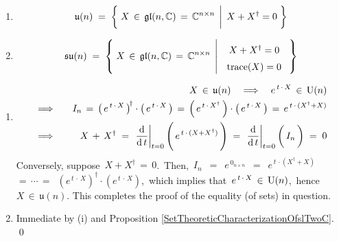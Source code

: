 \vskip 0.5cm
\begin{proposition}
\mbox{}
\vskip 0.1cm
\begin{enumerate}
\item
	\begin{equation*}
	\mathfrak{u}(n)
	\; = \;
		\left\{\;
			X \,\in\, \mathfrak{gl}(n,\C) \,=\, \C^{n \times n}
			\;\left\vert\;\,
				X + X^{\dagger} = \overset{{\color{white}1}}{0}
				\right.
			\,\right\}
	\end{equation*}
\item
	\begin{equation*}
	\mathfrak{su}(n)
	\; = \;
		\left\{\;
			X \,\in\, \mathfrak{gl}(n,\C) \,=\, \C^{n \times n}
			\;\left\vert\;\,
				\begin{array}{c}
				X + X^{\dagger} = \overset{{\color{white}1}}{0}
				\\
				\textnormal{trace}(X) = \overset{{\color{white}1}}{0}
				\end{array}
				\right.
			\,\right\}
	\end{equation*}
\end{enumerate}
\end{proposition}
\proof
\begin{enumerate}
\item
	\begin{eqnarray*}
	&&
		X \,\in\, \mathfrak{u}(n)
		\quad\Longrightarrow\quad
		e^{\,t\,\cdot\,X} \,\in\, \textnormal{U}(n)
	\\
	& \Longrightarrow\quad &
		I_{n}
			\,=\, \left(\,e^{\,t\,\cdot\,X}\,\right)^{\!\dagger} \cdot \left(\,e^{\,t\,\cdot\,X}\,\right)
			\,=\, \left(\,e^{\,t\,\cdot\,X^{\dagger}}\,\right) \cdot \left(\,e^{\,t\,\cdot\,X}\,\right)
			\,=\, e^{\,t\,\cdot\,(X^{\dagger}+X)}
	\\
	& \Longrightarrow\quad &
		X \,+\, X^{\dagger}
		\; = \;
			\left.\dfrac{\d}{\d\,t}\right\vert_{t=0}\left(\,\overset{{\color{white}1}}{e^{\,t\,\cdot\,(X+X^{\dagger})}}\,\right)
		\; = \;
			\left.\dfrac{\d}{\d\,t}\right\vert_{t=0}\left(\,\overset{{\color{white}1}}{I_{n}}\,\right)
		\; = \;
			0
	\end{eqnarray*}
	Conversely, suppose \,$X + X^{\dagger} \,=\, 0$.\,
	Then, \,$I_{n}$
	\,$=$\, $e^{\,0_{n \times n}}$
	\,$=$\, $e^{\,t\,\cdot(X^{\dagger}+X)}$
	\,$=\, \cdots \,=$\, $\left(e^{\,t\,\cdot\,X}\right)^{\!\dagger}\cdot\left(e^{\,t\,\cdot\,X}\right)$,\,
	which implies that \,$e^{\,t\,\cdot\,X} \,\in\, \textnormal{U}(n)$,\, hence \,$X \,\in\, \mathfrak{u}(n)$.
	This completes the proof of the equality (of sets) in question.
\item
	Immediate by (i) and Proposition \ref{SetTheoreticCharacterizationOfslTwoC}.
	\qed
\end{enumerate}

